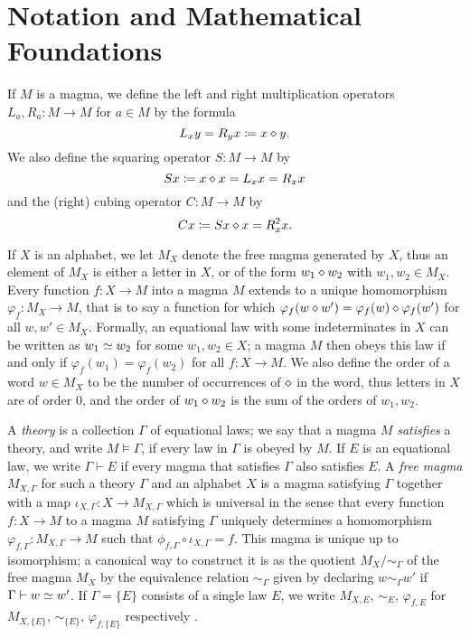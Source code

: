 \section{Notation and Mathematical Foundations}\label{notation-sec}

If $M$ is a magma, we define the left and right multiplication operators $L_a, R_a \colon M \to M$ for $a \in M$ by the formula
\begin{equation}\label{left-right}
    L_x y = R_y x \coloneqq x \diamond y.
\end{equation}
We also define the squaring operator $S \colon M \to M$ by
\begin{equation}\label{square-def}
    Sx \coloneqq x \diamond x = L_x x = R_x x
\end{equation}
and the (right) cubing operator $C \colon M \to M$ by
\begin{equation}\label{cube-def}
    Cx \coloneqq Sx \diamond x = R_x^2 x.
\end{equation}

If $X$ is an alphabet, we let $M_X$ denote the free magma generated by $X$, thus an element of $M_X$ is either a letter in $X$, or of the form $w_1 \diamond w_2$ with $w_1,w_2 \in M_X$.  Every function $f \colon X \to M$ into a magma $M$ extends to a unique homomorphism $\varphi_f \colon M_X \to M$, that is to say a function for which $\varphi_f(w \diamond w') = \varphi_f(w) \diamond \varphi_f(w')$ for all $w,w' \in M_X$.  Formally, an equational law with some indeterminates in $X$ can be written as $w_1 \simeq w_2$ for some $w_1, w_2 \in X$; a magma $M$ then obeys this law if and only if $\varphi_f(w_1) = \varphi_f(w_2)$ for all $f \colon X \to M$.  We also define the order of a word $w \in M_X$ to be the number of occurrences of $\diamond$ in the word, thus letters in $X$ are of order $0$, and the order of $w_1 \diamond w_2$ is the sum of the orders of $w_1, w_2$.

A \emph{theory} is a collection $\Gamma$ of equational laws; we say that a magma $M$ \emph{satisfies} a theory, and write $M \models \Gamma$, if every law in $\Gamma$ is obeyed by $M$.  If $E$ is an equational law, we write $\Gamma \vdash E$ if every magma that satisfies $\Gamma$ also satisfies $E$. A \emph{free magma} $M_{X,\Gamma}$ for such a theory $\Gamma$ and an alphabet $X$ is a magma satisfying $\Gamma$ together with a map $\iota_{X,\Gamma} \colon X \to M_{X,\Gamma}$ which is universal in the sense that every function $f \colon X \to M$ to a magma $M$ satisfying $\Gamma$ uniquely determines a homomorphism $\varphi_{f,\Gamma} \colon M_{X,\Gamma} \to M$ such that $\phi_{f,\Gamma} \circ \iota_{X,\Gamma} = f$.  This magma is unique up to isomorphism; a canonical way to construct it is as the quotient $M_X/\sim_\Gamma$ of the free magma $M_X$ by the equivalence relation $\sim_\Gamma$ given by declaring $w \sim_\Gamma w'$ if $\Gamma \vdash w \simeq w'$.  If $\Gamma = \{E\}$ consists of a single law $E$, we write $M_{X,E}$, $\sim_E$, $\varphi_{f,E}$ for $M_{X,\{E\}}$, $\sim_{\{E\}}$, $\varphi_{f,\{E\}}$ respectively . 

